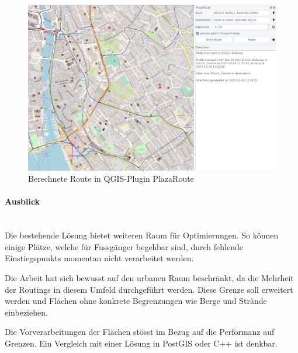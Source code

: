\begin{figure}[ht]
    \centering
    \includegraphics[width=1.0\linewidth]{technicalreport/img/qgis_plugin_plaza_route_cropped}
    \caption[Berechnete Route in QGIS-Plugin PlazaRoute]{Berechnete Route in QGIS-Plugin PlazaRoute}
    \label{fig:qgis_plugin_plaza_route_cropped}
\end{figure}

\paragraph{Ausblick}~\\
Die bestehende Lösung bietet weiteren Raum für Optimierungen. So können einige Plätze, welche für Fussgänger begehbar sind, durch fehlende \glspl{Einstiegspunkt} momentan nicht verarbeitet werden.

Die Arbeit hat sich bewusst auf den urbanen Raum beschränkt, da die Mehrheit der Routings in diesem Umfeld durchgeführt werden. Diese Grenze soll erweitert werden und Flächen ohne konkrete Begrenzungen wie Berge und Strände einbeziehen.

Die Vorverarbeitungen der Flächen stösst im Bezug auf die Performanz auf Grenzen. Ein Vergleich mit einer Lösung in PostGIS oder C++ ist denkbar.
